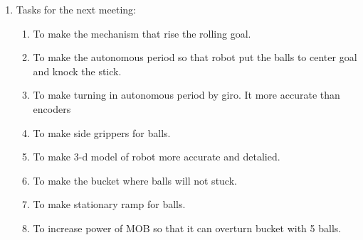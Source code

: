 \begin{enumerate}
\begin{enumerate}
	\end{enumerate}
	
	\item Tasks for the next meeting:
	\begin{enumerate}
		\item To make the mechanism that rise the rolling goal.
		
		\item To make the autonomous period so that robot put the balls to center goal and knock the stick.
		
		\item To make turning in autonomous period by giro. It more accurate than encoders
		
		\item To make side grippers for balls.
		
		\item To make 3-d model of robot more accurate and detalied.
		
		\item To make the bucket where balls will not stuck.
			
		\item To make stationary ramp for balls.
		
		\item To increase power of MOB so that it can overturn bucket with 5 balls.
		
	\end{enumerate}
	
\end{enumerate}
\fillpage